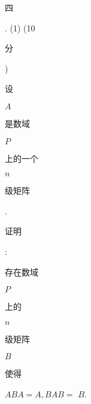 \documentclass[10pt]{article}
\begin{document}
\begin{CJK}{UTF8}{mj}四\end{CJK}. (1) (10 \begin{CJK}{UTF8}{mj}分\end{CJK}) \begin{CJK}{UTF8}{mj}设\end{CJK} $A$ \begin{CJK}{UTF8}{mj}是数域\end{CJK} $P$ \begin{CJK}{UTF8}{mj}上的一个\end{CJK} $n$ \begin{CJK}{UTF8}{mj}级矩阵\end{CJK}. \begin{CJK}{UTF8}{mj}证明\end{CJK}: \begin{CJK}{UTF8}{mj}存在数域\end{CJK} $P$ \begin{CJK}{UTF8}{mj}上的\end{CJK} $n$ \begin{CJK}{UTF8}{mj}级矩阵\end{CJK} $B$ \begin{CJK}{UTF8}{mj}使得\end{CJK} $A B A=A, B A B=$ $B$.
\end{document}
